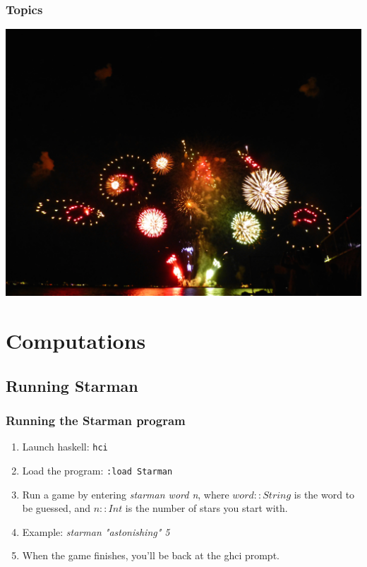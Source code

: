 \documentclass{beamer}
\begin{document}
\begin{frame}[fragile]
  \PresentationTitleSlide
\end{frame}

\begin{frame}[fragile]
  \frametitle{Topics}
  \tableofcontents
\end{frame}

\begin{frame}[fragile]
\begin{center}
\includegraphics[scale=0.075]
	{figures/jpg/pic03.jpg}
\end{center}
\end{frame}
\section{Computations}
\subsection{Running Starman}
\begin{frame}[fragile]
\frametitle{Running the Starman program}

\begin{enumerate}
\item Launch haskell: {\tt hci}
\item Load the program: {\tt :load Starman}
\item Run a game by entering \emph{starman word n}, where $word ::
  String$ is the word to be guessed, and $n :: Int$ is the number
  of stars you start with.
\item Example: \emph{starman "astonishing" 5}
\item When the game finishes, you'll be back at the ghci prompt.
\end{enumerate}
\end{frame}
\end{document}
